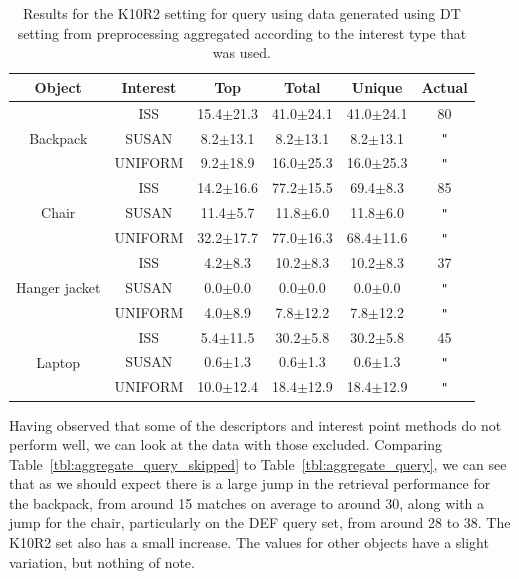 \documentclass[11pt,a4paper]{kth-mag}
\renewcommand{\textquotedbl}{\texttt{"}}
\newcommand{\ditto}[1][.4pt]{\xrfill{#1}~\textquotedbl~\xrfill{#1}}
\begin{document}
\begin{table}[H]
  \begin{tabular}{cc|cccc}
    Object & Interest & Top & Total & Unique & Actual \\\hline
    \multirow{3}{*}{Backpack} & ISS & 15.4$\pm$21.3 & 41.0$\pm$24.1 & 41.0$\pm$24.1 & 80\\
           & SUSAN & 8.2$\pm$13.1 & 8.2$\pm$13.1 & 8.2$\pm$13.1 & \ditto\\
           & UNIFORM & 9.2$\pm$18.9 & 16.0$\pm$25.3 & 16.0$\pm$25.3 & \ditto\\\hline
    \multirow{3}{*}{Chair} & ISS & 14.2$\pm$16.6 & 77.2$\pm$15.5 & 69.4$\pm$8.3 & 85\\
           & SUSAN & 11.4$\pm$5.7 & 11.8$\pm$6.0 & 11.8$\pm$6.0 & \ditto\\
           & UNIFORM & 32.2$\pm$17.7 & 77.0$\pm$16.3 & 68.4$\pm$11.6 & \ditto\\\hline
    \multirow{3}{*}{Hanger jacket} & ISS & 4.2$\pm$8.3 & 10.2$\pm$8.3 & 10.2$\pm$8.3 & 37\\
           & SUSAN & 0.0$\pm$0.0 & 0.0$\pm$0.0 & 0.0$\pm$0.0 & \ditto\\
           & UNIFORM & 4.0$\pm$8.9 & 7.8$\pm$12.2 & 7.8$\pm$12.2 & \ditto\\\hline
    \multirow{3}{*}{Laptop} & ISS & 5.4$\pm$11.5 & 30.2$\pm$5.8 & 30.2$\pm$5.8& 45\\
           & SUSAN & 0.6$\pm$1.3 & 0.6$\pm$1.3 & 0.6$\pm$1.3 & \ditto\\
           & UNIFORM & 10.0$\pm$12.4 & 18.4$\pm$12.9 & 18.4$\pm$12.9 & \ditto\\
  \end{tabular}
  \caption{Results for the K10R2 setting for query using data generated using DT
  setting from preprocessing aggregated according to the interest type that was
  used.}
\label{tbl:interest_k10r2}
\end{table}

Having observed that some of the descriptors and interest point methods do not
perform well, we can look at the data with those excluded. Comparing
Table~\ref{tbl:aggregate_query_skipped} to Table~\ref{tbl:aggregate_query}, we
can see that as we should expect there is a large jump in the retrieval
performance for the backpack, from around 15 matches on average to around 30,
along with a jump for the chair, particularly on the DEF query set, from around
28 to 38. The K10R2 set also has a small increase. The values for other objects
have a slight variation, but nothing of note.
\newpage
\end{document}
